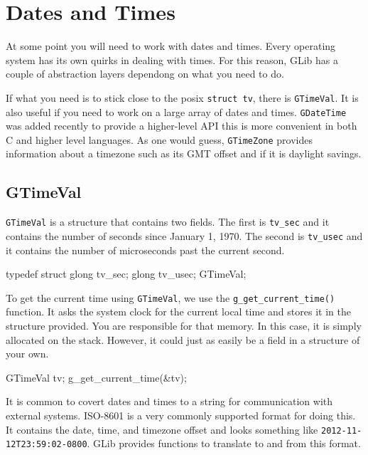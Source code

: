 \chapter{Dates and Times}

At some point you will need to work with dates and times.
Every operating system has its own quirks in dealing with times.
For this reason, GLib has a couple of abstraction layers dependong on what you need to do.

If what you need is to stick close to the posix \verb|struct tv|, there is \verb|GTimeVal|.
It is also useful if you need to work on a large array of dates and times.
\verb|GDateTime| was added recently to provide a higher-level API this is more convenient in both C and higher level languages.
As one would guess, \verb|GTimeZone| provides information about a timezone such as its GMT offset and if it is daylight savings.

\section{GTimeVal}

\verb|GTimeVal| is a structure that contains two fields.
The first is \verb|tv_sec| and it contains the number of seconds since January 1, 1970.
The second is \verb|tv_usec| and it contains the number of microseconds past the current second.

\begin{code}{}
typedef struct
{
    glong tv_sec;
    glong tv_usec;
} GTimeVal;
\end{code}

To get the current time using \verb|GTimeVal|, we use the \verb|g_get_current_time()| function.
It asks the system clock for the current local time and stores it in the structure provided.
You are responsible for that memory.
In this case, it is simply allocated on the stack.
However, it could just as easily be a field in a structure of your own.

\begin{code}{}
GTimeVal tv;
g_get_current_time(&tv);
\end{code}

It is common to covert dates and times to a string for communication with external systems.
ISO-8601 is a very commonly supported format for doing this.
It contains the date, time, and timezone offset and looks something like \verb|2012-11-12T23:59:02-0800|.
GLib provides functions to translate to and from this format.

